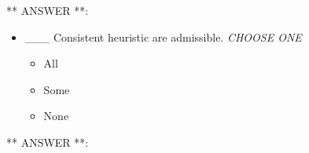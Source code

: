 \documentclass[11pt]{article}
\providecommand{\tightlist}{%
      \setlength{\itemsep}{0pt}\setlength{\parskip}{0pt}}
\begin{document}
** ANSWER **:

    \begin{itemize}
\tightlist
\item
  \_\_\_ Consistent heuristic are admissible. \emph{CHOOSE ONE}

  \begin{itemize}
  \tightlist
  \item
    All
  \item
    Some
  \item
    None
  \end{itemize}
\end{itemize}

** ANSWER **:


    
    
    
    
\end{document}
